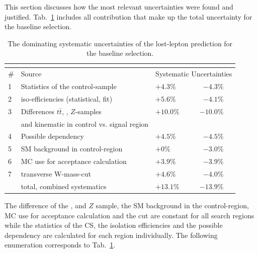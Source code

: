 This section discusses how the most relevant uncertainties were found and justified. Tab.~\ref{tab:uncertainties} includes all contribution that make up the total uncertainty for the baseline selection.
\begin{table}[tbn]
\caption{The dominating systematic uncertainties of the lost-lepton prediction for the baseline selection.} 
\begin{center}
\begin{tabular}{lll|rr}
                    &\multicolumn{2}{c}{} \\\hline
 \# &Source &\multicolumn{3}{|c|}{Systematic Uncertainties} \\\hline
 1	&Statistics of the control-sample                & $+4.3\%$ & $-4.3\%$\\
 2	&iso-efficiencies (statistical, fit)   	         & $+5.6\%$ & $-4.1\%$\\
 3	&Differences $t\bar{t}$, \wpj, $Z$-samples        & $+10.0\%$ & $-10.0\%$\\
 	&and kinematic in control vs. signal region      &  & \\
 4	&Possible \MHT dependency		         & $+4.5\%$ & $-4.5\%$\\
 5	&SM background in control-region                 &    $+0\%$ & $-3.0\%$ \\
 6	&MC use for acceptance calculation               & $+3.9\%$ & $-3.9\%$\\
 7	&transverse W-mass-cut			         & $+4.6\%$ & $-4.0\%$ \\
\hline
	&total, combined systematics                     & $+13.1\%$  & $-13.9\%$\\
\hline
 \end{tabular}
\end{center}
\label{tab:uncertainties}
\end{table}
The difference of the \ttbar, \wpj and $Z$ sample, the SM background in the control-region, MC use for acceptance calculation and the \mt cut are constant for all search regions while the statistics of the CS, the isolation efficiencies and the possible \MHT dependency are calculated for each region individually.
The following enumeration corresponds to Tab.~\ref{tab:uncertainties}.

